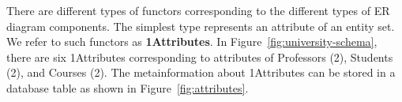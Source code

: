 \documentclass{acm_proc_article-sp}
\begin{document}
\begin{table}[btp] \centering
{}
\caption{Translation from ER Diagram to Relational Random Variable. %
 \label{table:translation}}
\end{table}



There are different types of functors corresponding to the different types of ER diagram components. The simplest type represents an attribute of an entity set. We refer to such functors as \textbf{1Attributes}. In Figure~\ref{fig:university-schema}, there are six 1Attributes corresponding to attributes of Professors (2), Students (2), and Courses (2). 
The metainformation about 1Attributes can be stored in a database table as shown in Figure~\ref{fig:attributes}. 
\end{document}
